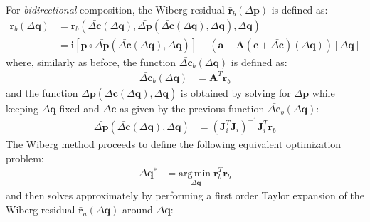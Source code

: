For \emph{bidirectional} composition, the Wiberg residual $\bar{\mathbf{r}}_b (\Delta \mathbf{p})$ is defined as:
\begin{equation}
    \begin{aligned}
        \bar{\mathbf{r}}_b(\Delta\mathbf{q}) & = \mathbf{r}_b(\bar{\Delta \mathbf{c}}(\Delta\mathbf{q}), \bar{\Delta \mathbf{p}}(\bar{\Delta \mathbf{c}}(\Delta\mathbf{q}), \Delta\mathbf{q}), \Delta\mathbf{q})
        \\
        & = \mathbf{i}[\mathbf{p} \circ \bar{\Delta \mathbf{p}}(\bar{\Delta \mathbf{c}}(\Delta\mathbf{q}), \Delta\mathbf{q})] - (\mathbf{a} - \mathbf{A}(\mathbf{c} + \bar{\Delta \mathbf{c}})(\Delta\mathbf{q}))[\Delta \mathbf{q}]
    \label{eq:bidirectional_wiberg_residual}
    \end{aligned}
\end{equation}
where, similarly as before, the function $\bar{\Delta \mathbf{c}}_b(\Delta \mathbf{q})$ is defined as:
\begin{equation}
    \begin{aligned}
        \bar{\Delta \mathbf{c}}_b(\Delta \mathbf{q}) & = \mathbf{A}^T \mathbf{r}_b
        \label{eq:asymmetric_wiberg_c_function}
    \end{aligned}
\end{equation}
and the function $\bar{\Delta \mathbf{p}}(\bar{\Delta \mathbf{c}}(\Delta\mathbf{q}), \Delta\mathbf{q})$ is obtained by solving for $\Delta\mathbf{p}$ while keeping $\Delta \mathbf{q}$ fixed and $\Delta\mathbf{c}$ as given by the previous function $\bar{\Delta \mathbf{c}}_b(\Delta \mathbf{q})$:
\begin{equation}
    \begin{aligned}
        \bar{\Delta \mathbf{p}}(\bar{\Delta \mathbf{c}}(\Delta\mathbf{q}), \Delta\mathbf{q}) & = \left( \mathbf{J}_i^T \mathbf{J}_i \right)^{-1} \mathbf{J}_i^T  \mathbf{r}_b
        \label{eq:asymmetric_wiberg_p_function}
    \end{aligned}
\end{equation}
The Wiberg method proceeds to define the following equivalent optimization problem:
\begin{equation}
    \begin{aligned}
        \Delta\mathbf{q}^* & = \underset{\Delta\mathbf{q}}{\mathrm{arg\,min\;}} \bar{\mathbf{r}}_b^T\bar{\mathbf{r}}_b
    \label{eq:bidirectional_wiberg_problem1}
    \end{aligned}
\end{equation}
and then solves approximately by performing a first order Taylor expansion of the Wiberg residual $\bar{\mathbf{r}}_a (\Delta \mathbf{q})$ around $\Delta\mathbf{q}$:
